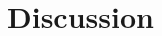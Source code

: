 \doublespacing %

\chapter{Discussion}
\label{ch4}

\begin{spacing}{1} %
\minitoc %
\end{spacing} %
\thesisspacing %



% 


% 


% 


% 
